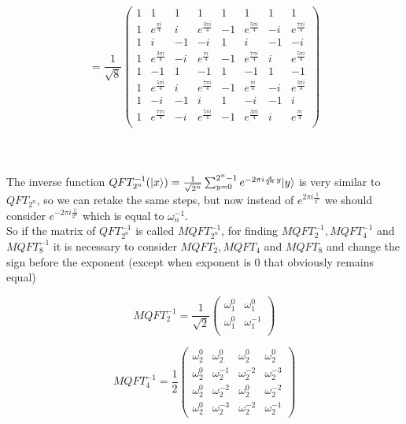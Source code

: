 \documentclass{article}
\DeclarePairedDelimiter\ket{\lvert}{\rangle}
\begin{document}
\[
= \frac{1}{\sqrt8} \begin{pmatrix} 
1 & 1 & 1 & 1 & 1 & 1 & 1 & 1 \\ 
1 & e^{\frac{\pi  i}{4}} & i & e^{\frac{3 \pi  i}{4}} & -1 & e^{\frac{5 \pi  i}{4}} & -i & e^{\frac{7 \pi  i}{4}} \\ 
1 & i & -1 & -i & 1 & i & -1 & -i \\ 
1 & e^{\frac{3 \pi  i}{4}} & -i & e^{\frac{\pi  i}{4}} &-1 & e^{\frac{7 \pi  i}{4}} & i & e^{\frac{5 \pi  i}{4}} \\
1 & -1 & 1 & -1 & 1 & -1 & 1 & -1 \\ 
1 & e^{\frac{5 \pi  i}{4}} & i & e^{\frac{7 \pi  i}{4}} & -1 & e^{\frac{\pi  i}{4}} & -i & e^{\frac{3 \pi  i}{4}} \\ 
1 & -i & -1 & i & 1 & -i & -1 & i \\ 
1 & e^{\frac{7 \pi  i}{4}} & -i & e^{\frac{5 \pi  i}{4}} & -1 & e^{\frac{3 \pi  i}{4}} & i & e^{\frac{\pi  i}{4}} \\ 
\end{pmatrix} \]
\\
\\
\\
The inverse function $QFT^{-1}_{2^n}(\ket{x}) = \frac{1}{\sqrt{2^n}} \sum_{y=0}^{2^n-1} e^{-2\pi i \frac{x}{2^n}y} \ket{y}$ is very similar to $QFT_{2^n}$, so we can retake the same steps, but now instead of $e^{2\pi i \frac{1}{2^n}}$ we should consider $e^{-2\pi i \frac{1}{2^n}}$ which is equal to $\omega_n^{-1}$. \\
So if the matrix of $QFT^{-1}_{2^n}$ is called $MQFT^{-1}_{2^n}$, for finding $MQFT^{-1}_{2}, MQFT^{-1}_{4}$ and $MQFT^{-1}_{8}$ it is necessary to consider $MQFT_{2}, MQFT_{4}$ and $MQFT_{8}$ and change the sign before the exponent (except when exponent is $0$ that obviously remains equal)

\[MQFT_2^{-1} = 
\frac{1}{\sqrt{2}} \begin{pmatrix} 
\omega_1^{0}  & \omega_1^{0} \\ 
\omega_1^{0}  & \omega_1^{-1} \\ 
\end{pmatrix} \]


\[MQFT_4^{-1} =  
\frac{1}{2} \begin{pmatrix} 
\omega_2^{0}  & \omega_2^{0}  & \omega_2^{0}  & \omega_2^{0} \\ 
\omega_2^{0}  & \omega_2^{-1}  & \omega_2^{-2}  & \omega_2^{-3} \\ 
\omega_2^{0}  & \omega_2^{-2}  & \omega_2^{0}  & \omega_2^{-2} \\ 
\omega_2^{0}  & \omega_2^{-3}  & \omega_2^{-2}  & \omega_2^{-1}
\end{pmatrix} \]
\end{document}
